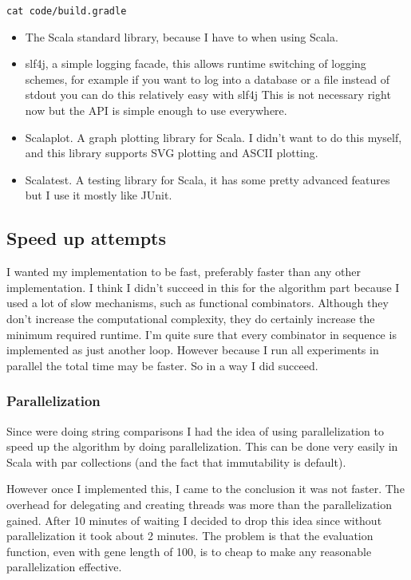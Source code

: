 \documentclass{article}
\begin{document}
\begin{empfile}
\begin{lstlisting}[frame=single]
	cat code/build.gradle
\end{lstlisting}


\begin{itemize}
	\item The Scala standard library, because I have to when using Scala.
	\item slf4j, a simple logging facade, this allows runtime switching of
		logging schemes, for example if you want to log into a database or
		a file instead of stdout you can do this relatively easy with slf4j
		This is not necessary right now but the API is simple enough to use
		everywhere.
	\item Scalaplot. A graph plotting library for Scala. I didn't want to
		do this myself, and this library supports SVG plotting and ASCII
		plotting.
	\item Scalatest. A testing library for Scala, it has some pretty advanced
		features but I use it mostly like JUnit.
\end{itemize}

\subsection{Speed up attempts}
I wanted my implementation to be fast, preferably faster than any other
implementation. I think I didn't succeed in this for the algorithm part
because I used a lot of slow mechanisms, such as functional combinators.
Although they don't increase the computational complexity,
they do certainly increase
the minimum required runtime. I'm quite sure that every combinator in sequence
is implemented as just another loop. However because I
run all experiments in parallel the total time may be faster. So in a way
I did succeed.

\subsubsection{Parallelization}
Since were doing string comparisons I had the idea of using parallelization to
speed up the algorithm by doing parallelization. This can be done very easily
in Scala with par collections (and the fact that immutability is default).

However once I implemented this, I came to the conclusion it was not faster.
The overhead for delegating and creating threads was more than the parallelization
gained.  After 10 minutes of waiting I decided to drop this idea
since without parallelization it took about 2 minutes.
The problem is that the evaluation function, even with gene length of 100, is
to cheap to make any reasonable parallelization effective.


\end{empfile}
\end{document}
